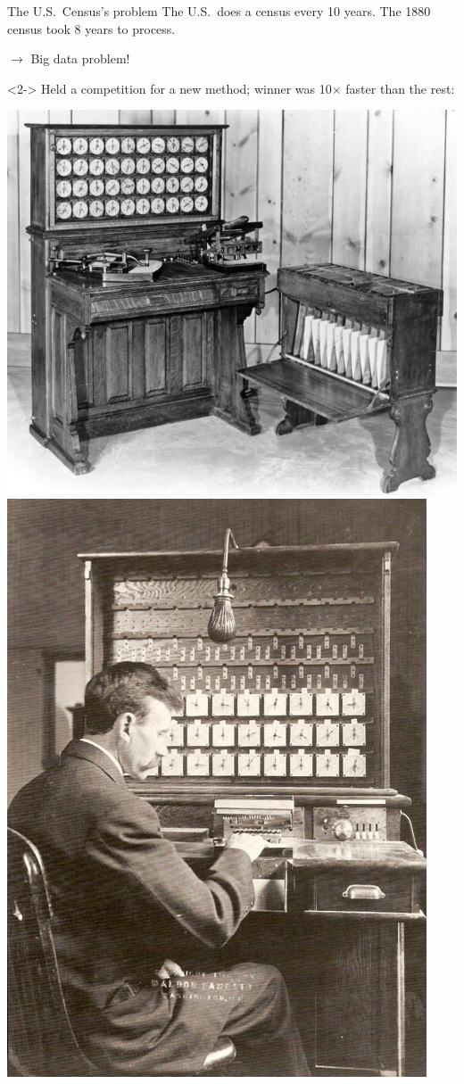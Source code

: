 \documentclass[aspectratio=169]{beamer}
\begin{document}
\begin{frame}{The U.S.\ Census's problem}
\large
\vspace{0.35 cm}
The U.S.\ does a census every 10 years. The 1880 census took 8 years to process.
\begin{center}
$\longrightarrow$ Big data problem!
\end{center}

\vspace{0.15 cm}
\begin{uncoverenv}<2->
Held a competition for a new method; winner was 10$\times$ faster than the rest:

\begin{center}
\includegraphics[height=5.3 cm]{hollerith.jpg}\hspace{1 cm}\includegraphics[height=5.3 cm]{1908_Hollerith_Machine.jpg}
\end{center}
\end{uncoverenv}
\end{frame}
\end{document}
